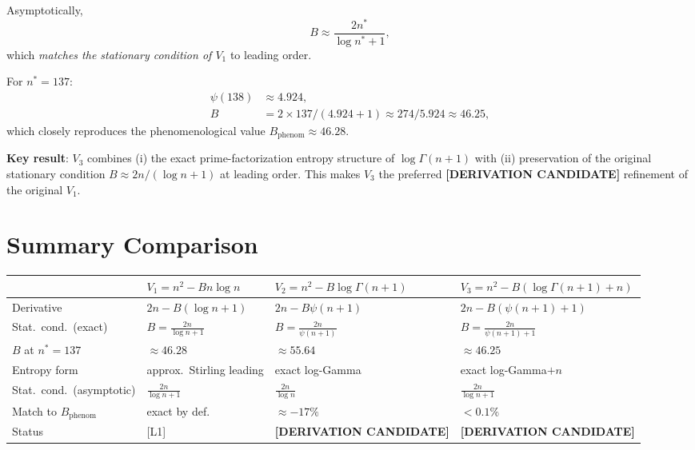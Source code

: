 \documentclass[12pt,a4paper]{article}
\theoremstyle{definition}
\theoremstyle{remark}
\newcommand{\DERIVCAND}{\textcolor{orange!80!black}{\textbf{[DERIVATION CANDIDATE]}}}
\begin{document}
Asymptotically,
\begin{equation}
  B \approx \frac{2n^*}{\log n^* + 1},
  \label{eq:V3_stat_asymp}
\end{equation}
which \emph{matches the stationary condition of $V_1$} to leading order.

For $n^* = 137$:
\begin{align}
  \psi(138) &\approx 4.924, \\
  B &= 2\times137/(4.924 + 1) \approx 274/5.924 \approx 46.25,
\end{align}
which closely reproduces the phenomenological value $B_{\mathrm{phenom}} \approx 46.28$.

\begin{resultbox}
\textbf{Key result}: $V_3$ combines (i) the exact prime-factorization entropy structure
of $\log\Gamma(n+1)$ with (ii) preservation of the original stationary condition
$B \approx 2n/(\log n + 1)$ at leading order.  This makes $V_3$ the preferred
\DERIVCAND{} refinement of the original $V_1$.
\end{resultbox}

\section{Summary Comparison}
\label{sec:comparison}

\begin{center}
\begin{tabular}{@{}llll@{}}
\toprule
& $V_1 = n^2 - Bn\log n$ & $V_2 = n^2 - B\log\Gamma(n+1)$ & $V_3 = n^2 - B(\log\Gamma(n+1)+n)$ \\
\midrule
Derivative & $2n - B(\log n + 1)$ & $2n - B\psi(n+1)$ & $2n - B(\psi(n+1)+1)$ \\
Stat.\ cond.\ (exact) & $B = \frac{2n}{\log n+1}$ & $B = \frac{2n}{\psi(n+1)}$ & $B = \frac{2n}{\psi(n+1)+1}$ \\
$B$ at $n^*=137$ & $\approx 46.28$ & $\approx 55.64$ & $\approx 46.25$ \\
Entropy form & approx.\ Stirling leading & exact log-Gamma & exact log-Gamma$+n$ \\
Stat.\ cond.\ (asymptotic) & $\frac{2n}{\log n+1}$ & $\frac{2n}{\log n}$ & $\frac{2n}{\log n+1}$ \\
Match to $B_\mathrm{phenom}$ & exact by def. & $\approx -17\%$ & $< 0.1\%$ \\
Status & [L1] & \DERIVCAND{} & \DERIVCAND{} \\
\bottomrule
\end{tabular}
\end{center}
\end{document}
